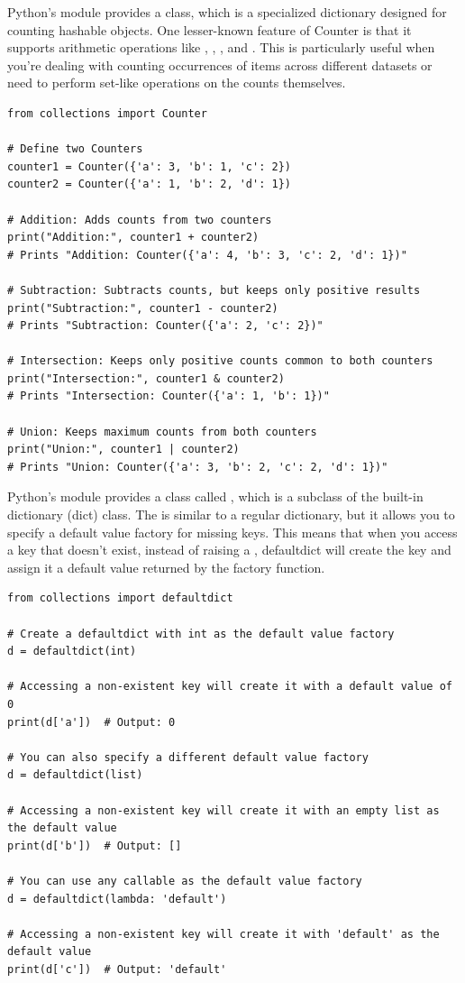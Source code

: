 Python's  module provides a  class, which is a specialized dictionary designed for counting hashable objects. One lesser-known feature of Counter is that it supports arithmetic operations like , , , and . This is particularly useful when you're dealing with counting occurrences of items across different datasets or need to perform set-like operations on the counts themselves.
\begin{lstlisting}
from collections import Counter

# Define two Counters
counter1 = Counter({'a': 3, 'b': 1, 'c': 2})
counter2 = Counter({'a': 1, 'b': 2, 'd': 1})

# Addition: Adds counts from two counters
print("Addition:", counter1 + counter2)
# Prints "Addition: Counter({'a': 4, 'b': 3, 'c': 2, 'd': 1})"

# Subtraction: Subtracts counts, but keeps only positive results
print("Subtraction:", counter1 - counter2)
# Prints "Subtraction: Counter({'a': 2, 'c': 2})"

# Intersection: Keeps only positive counts common to both counters
print("Intersection:", counter1 & counter2)
# Prints "Intersection: Counter({'a': 1, 'b': 1})"

# Union: Keeps maximum counts from both counters
print("Union:", counter1 | counter2)
# Prints "Union: Counter({'a': 3, 'b': 2, 'c': 2, 'd': 1})"
\end{lstlisting}

Python's  module provides a class called , which is a subclass of the built-in dictionary (dict) class. The  is similar to a regular dictionary, but it allows you to specify a default value factory for missing keys. This means that when you access a key that doesn't exist, instead of raising a , defaultdict will create the key and assign it a default value returned by the factory function.
\begin{lstlisting}
from collections import defaultdict

# Create a defaultdict with int as the default value factory
d = defaultdict(int)

# Accessing a non-existent key will create it with a default value of 0
print(d['a'])  # Output: 0

# You can also specify a different default value factory
d = defaultdict(list)

# Accessing a non-existent key will create it with an empty list as the default value
print(d['b'])  # Output: []

# You can use any callable as the default value factory
d = defaultdict(lambda: 'default')

# Accessing a non-existent key will create it with 'default' as the default value
print(d['c'])  # Output: 'default'
\end{lstlisting}









